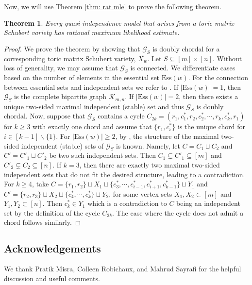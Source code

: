\documentclass[11pt]{amsart}
\newtheorem{theorem}{Theorem}[section]
\theoremstyle{definition}
\theoremstyle{definition}
\theoremstyle{definition}
\theoremstyle{definition}
\newcommand{\Xw}{\overline{X_w}}
\newcommand{\Ess}{\mathrm{Ess}}
\begin{document}
\noindent Now, we will use Theorem \ref{thm: rat mle} to prove the following theorem. 

\begin{theorem}\label{thm: rational MLE}
    Every quasi-independence model that arises from a toric matrix Schubert variety has rational maximum likelihood estimate. 
\end{theorem}
\begin{proof}
We prove the theorem by showing that $\mathcal{G}_S$ is doubly chordal for a corresponding toric matrix Schubert variety, $\Xw$. Let $S\subseteq [m]\times[n]$. Without loss of generality, we may assume that $\mathcal{G}_S$ is connected. We differentiate cases based on the number of elements in the essential set $\Ess(w)$. For the connection between essential sets and independent sets we refer to \cite[Section 4.2]{portakal2023rigid}. If $|\Ess(w)| = 1$, then $\mathcal{G}_S$ is the complete bipartite graph $\mathcal K_{m,n}$. If $|\Ess(w)| = 2$, then there exists a unique two-sided maximal independent (stable) set and thus $\mathcal{G}_S$ is doubly chordal. Now, suppose that $\mathcal{G}_S$ contains a cycle $C_{2k} = (r_1,c^*_1, r_2, c^*_2, \cdots, r_k,c^*_k,r_1)$ for $k \geq 3$ with exactly one chord and assume that $\{r_1, c^*_i\}$ is the unique chord for $i \in [k-1] \backslash \{1\}$. For $|\Ess(w)| \geq 2$, by \cite[Lemma 4.6]{portakal2023rigid}, the structure of the maximal two-sided independent (stable) sets of $\mathcal{G}_S$ is known. Namely, let $C = C_1 \sqcup C_2$ and $C' = C'_1 \sqcup C'_2$ be two such independent sets. Then $C_1 \subsetneq C'_1 \subseteq [m]$ and $C'_2 \subsetneq C_2 \subseteq [n]$. 
If $k = 3$, then there are exactly two maximal two-sided independent sets that do not fit the desired structure, leading to a contradiction. For $k \geq 4$, take $C = \{r_1, r_2\} \sqcup X_1 \sqcup \{c^*_3, \cdots, c^*_{i-1}, c^*_{i+1}, c^*_{k-1}\} \sqcup Y_1$ and $C' = \{r_2, r_3\} \sqcup X_2 \sqcup \{c^*_4, \cdots, c^*_k\} \sqcup Y_2$, for some vertex sets $X_1, X_2 \subset [m]$ and $Y_1, Y_2 \subset [n]$. Then $c^*_k \in Y_1$ which is a contradiction to $C$ being an independent set by the definition of the cycle $C_{2k}$. The case where the cycle does not admit a chord follows similarly.  
\end{proof}

\subsection*{Acknowledgements}
We thank Pratik Misra, Colleen Robichaux, and Mahrud Sayrafi for the helpful discussion and useful comments. 




\end{document}
